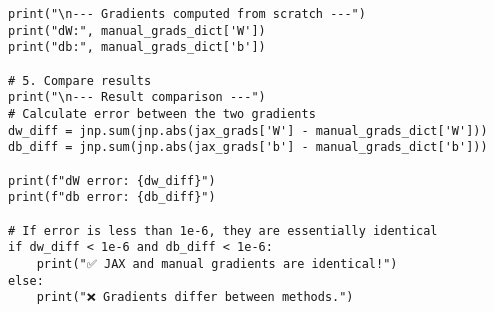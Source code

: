 \documentclass{article}
\begin{document}
\begin{lstlisting}
print("\n--- Gradients computed from scratch ---")
print("dW:", manual_grads_dict['W'])
print("db:", manual_grads_dict['b'])

# 5. Compare results
print("\n--- Result comparison ---")
# Calculate error between the two gradients
dw_diff = jnp.sum(jnp.abs(jax_grads['W'] - manual_grads_dict['W']))
db_diff = jnp.sum(jnp.abs(jax_grads['b'] - manual_grads_dict['b']))

print(f"dW error: {dw_diff}")
print(f"db error: {db_diff}")

# If error is less than 1e-6, they are essentially identical
if dw_diff < 1e-6 and db_diff < 1e-6:
    print("✅ JAX and manual gradients are identical!")
else:
    print("❌ Gradients differ between methods.")
\end{lstlisting}
\end{document}
